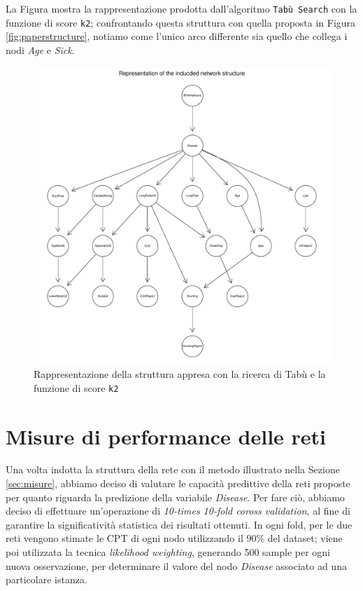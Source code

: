 La Figura mostra la rappresentazione prodotta dall'algoritmo \texttt{Tabù Search} con la funzione di score \texttt{k2}; confrontando questa struttura con quella proposta in Figura \ref{fig:paperstructure}, notiamo come l'unico arco differente sia quello che collega i nodi \textit{Age} e \textit{Sick}.

\begin{figure}
	\centering
	\includegraphics[width=.9\linewidth]{images/induced_structure}
	\caption{Rappresentazione della struttura appresa con la ricerca di Tabù e la funzione di score \texttt{k2}}
	\label{fig:inducedstructure}
\end{figure}

\newpage
\section{Misure di performance delle reti}
Una volta indotta la struttura della rete con il metodo illustrato nella Sezione \ref{sec:misure}, abbiamo deciso di valutare le capacità predittive della reti proposte per quanto riguarda la predizione della variabile \textit{Disease}. Per fare ciò, abbiamo deciso di effettuare un'operazione di \textit{10-times 10-fold coross validation}, al fine di garantire la significatività statistica dei risultati ottenuti. In ogni fold, per le due reti vengono stimate le CPT di ogni nodo utilizzando il $90\%$ del dataset; viene poi utilizzata la tecnica \textit{likelihood weighting}, generando 500 sample per ogni nuova osservazione, per determinare il valore del nodo \textit{Disease} associato ad una particolare istanza.

